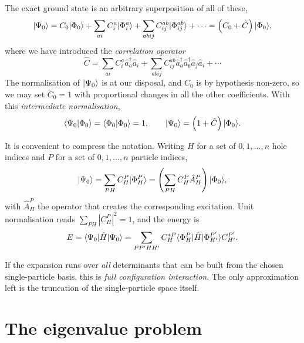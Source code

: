 The exact ground state is an arbitrary superposition of all of these,
\begin{equation}
  \vert \Psi_0 \rangle = C_0\vert \Phi_0 \rangle
    + \sum_{ai}C_i^a\vert \Phi_i^a \rangle
    + \sum_{abij}C_{ij}^{ab}\vert \Phi_{ij}^{ab} \rangle + \cdots
    = \left(C_0+\hat{C}\right)\vert \Phi_0 \rangle,
  \label{eq:5-ciexpansion}
\end{equation}
where we have introduced the \emph{correlation operator}
\begin{equation}
  \hat{C} = \sum_{ai}C_i^a\hat{a}_a^{\dagger}\hat{a}_i
    + \sum_{abij}C_{ij}^{ab}
      \hat{a}_a^{\dagger}\hat{a}_b^{\dagger}\hat{a}_j\hat{a}_i + \cdots
  \label{eq:5-correlationoperator}
\end{equation}
The normalisation of $\vert \Psi_0 \rangle$ is at our disposal, and $C_0$ is by
hypothesis non-zero, so we may set $C_0=1$ with proportional changes in all
the other coefficients.  With this \emph{intermediate normalisation},
\begin{equation}
  \langle \Psi_0 \vert \Phi_0 \rangle = \langle \Phi_0 \vert \Phi_0 \rangle = 1,
  \qquad
  \vert \Psi_0 \rangle = \left(1+\hat{C}\right)\vert \Phi_0 \rangle.
  \label{eq:5-intermediate}
\end{equation}

It is convenient to compress the notation.  Writing $H$ for a set of
$0,1,\dots,n$ hole indices and $P$ for a set of $0,1,\dots,n$ particle
indices,
\begin{equation}
  \vert \Psi_0 \rangle = \sum_{PH}C_H^P\vert \Phi_H^P \rangle
    = \left(\sum_{PH}C_H^P\hat{A}_H^P\right)\vert \Phi_0 \rangle,
  \label{eq:5-compact}
\end{equation}
with $\hat{A}_H^P$ the operator that creates the corresponding excitation.
Unit normalisation reads $\sum_{PH}|C_H^P|^2=1$, and the energy is
\begin{equation}
  E = \langle \Psi_0 | \hat{H} | \Psi_0 \rangle
    = \sum_{PP'HH'}C_H^{*P}
      \langle \Phi_H^P | \hat{H} | \Phi_{H'}^{P'} \rangle C_{H'}^{P'} .
  \label{eq:5-energy}
\end{equation}

If the expansion runs over \emph{all} determinants that can be built from the
chosen single-particle basis, this is \emph{full configuration interaction}.
The only approximation left is the truncation of the single-particle space
itself.

\section{The eigenvalue problem}
\label{sec:cieigenvalue}

